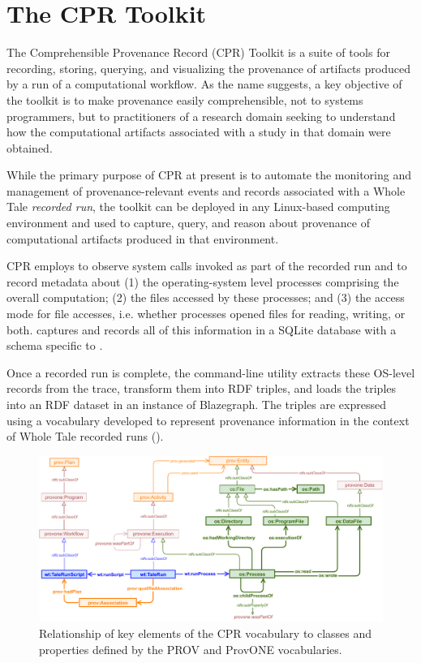 \section{The CPR Toolkit}

The Comprehensible Provenance Record (CPR) Toolkit is a suite of tools for recording, storing, querying, and visualizing the provenance of artifacts produced by a run of a computational workflow. As the name suggests, a key objective of the toolkit is to make provenance easily comprehensible, not to systems programmers, but to practitioners of a research domain seeking to understand how the computational artifacts associated with a study in that domain were obtained.

While the primary purpose of CPR at present is to automate the monitoring and management of provenance-relevant events and records associated with a Whole Tale \emph{recorded run}, the toolkit can be deployed in any Linux-based computing environment and used to capture, query, and reason about provenance of computational artifacts produced in that environment.

CPR employs  \cite{rampin_reprozip_2016} to observe system calls invoked as part of the recorded run and to record metadata about (1) the operating-system level processes comprising the overall computation; (2) the files accessed by these processes; and (3) the access mode for file accesses, i.e. whether processes opened files for reading, writing, or both.  captures and records all of this information in a SQLite database with a schema specific to .

Once a recorded run is complete, the  command-line utility extracts these OS-level records from the  trace, transform them into RDF triples, and loads the triples into an RDF dataset in an instance of Blazegraph. The triples are expressed using a vocabulary developed to represent provenance information in the context of Whole Tale recorded runs (). 

\begin{figure}[h]
    \includegraphics[width=\linewidth]{figures/cpr-vocab.pdf}
    \caption{Relationship of key elements of the CPR vocabulary to classes and properties defined by the PROV and ProvONE vocabularies.}
    \label{fig:cpr-vocab}
\end{figure}

